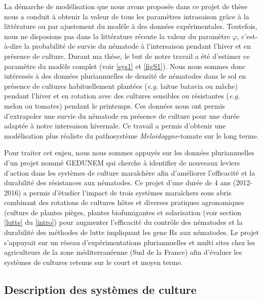 	La démarche de modélisation que nous avons proposée dans ce projet de thèse nous a conduit à obtenir la valeur de tous les paramètres intrasaison  grâce à la littérature ou  par ajustement du modèle à des données expérimentales. Toutefois, nous ne disposions pas dans la littérature récente  la valeur   du paramètre $\varphi$, c'est-à-dire  la probabilité de survie du nématode à l'intersaison pendant l'hiver et en présence de culture.
Durant ma thèse, le but de notre travail a été d'estimer ce paramètre du modèle complet  (voir \eqref{sys1} et \autoref{figS1}).
Nous nous sommes donc intéressés à des données pluriannuelles de densité  de nématodes dans le sol en présence de cultures  habituellement plantées (\textit{e.g.} laitue batavia ou mâche) pendant l'hiver et en rotation avec des cultures  sensibles ou résistantes (\textit{e.g.} melon ou tomates) pendant le printemps. Ces données nous ont permis d’extrapoler une survie du nématode en présence de culture pour une durée adaptée  à notre intersaison hivernale. Ce travail a permis d’obtenir une modélisation plus réaliste du pathosystème \textit{Meloidogyne}-tomate sur le long terme.
	
	Pour traiter cet enjeu,  nous nous sommes  appuyés sur les données pluriannuelles d'un projet nommé \gls{GEDUNEM}  qui cherche à identifier de nouveaux leviers d'action dans les \og systèmes \fg{} de culture maraîchère afin d'améliorer l'efficacité et la durabilité des résistances aux nématodes. 
Ce projet d'une durée de 4 ans (2012-2016) a permis d'étudier l'impact de trois systèmes maraîchers sous abris combinant des rotations de cultures hôtes  et diverses pratiques agronomiques  (culture de plantes pièges, plantes biofumigantes et  solarisation (voir section \ref{lutte} du \autoref{intro}) pour augmenter l’efficacité du contrôle des nématodes et la durabilité des méthodes de lutte impliquant les \glspl{gene R} aux nématodes.
Le projet s'appuyait sur  un réseau d’expérimentations pluriannuelles et multi sites chez les agriculteurs de la zone méditerranéenne (Sud de la France) afin d'évaluer les systèmes de cultures retenus sur le court et moyen terme.
	
\subsection{Description des systèmes de culture} 

